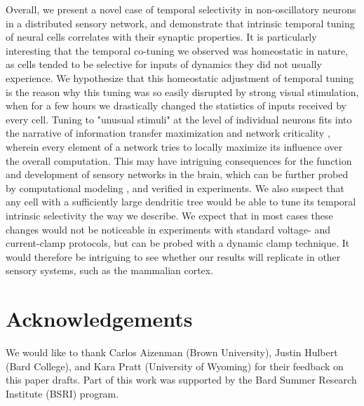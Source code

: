 \documentclass{article}
\begin{document}
Overall, we present a novel case of temporal selectivity in non-oscillatory neurons in a distributed sensory network, and demonstrate that intrinsic temporal tuning of neural cells correlates with their synaptic properties. It is particularly interesting that the temporal co-tuning we observed was homeostatic in nature, as cells tended to be selective for inputs of dynamics they did not usually experience. We hypothesize that this homeostatic adjustment of temporal tuning is the reason why this tuning was so easily disrupted by strong visual stimulation, when for a few hours we drastically changed the statistics of inputs received by every cell. Tuning to "unusual stimuli" at the level of individual neurons fits into the narrative of information transfer maximization \citep{brenner2000} and network criticality \citep{rubinov2011}, wherein every element of a network tries to locally maximize its influence over the overall computation. This may have intriguing consequences for the function and development of sensory networks in the brain, which can be further probed by computational modeling \citep{khakhalin2014,jang2016}, and verified in experiments. We also suspect that any cell with a sufficiently large dendritic tree would be able to tune its temporal intrinsic selectivity the way we describe. We expect that in most cases these changes would not be noticeable in experiments with standard voltage- and current-clamp protocols, but can be probed with a dynamic clamp technique. It would therefore be intriguing to see whether our results will replicate in other sensory systems, such as the mammalian cortex.


\section*{Acknowledgements}

We would like to thank Carlos Aizenman (Brown University), Justin Hulbert (Bard College), and Kara Pratt (University of Wyoming) for their feedback on this paper drafts. Part of this work was supported by the Bard Summer Research Institute (BSRI) program.

\end{document}
